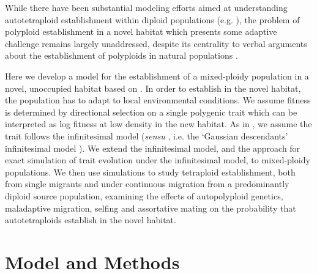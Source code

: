 \documentclass[unnumsec,webpdf,modern,large]{_oup-authoring-template}
\theoremstyle{thmstyleone}%
\theoremstyle{thmstyletwo}%
\theoremstyle{thmstylethree}%
\begin{document}
While there have been substantial modeling efforts aimed at understanding
autotetraploid establishment within diploid populations (e.g. \cite{levin1975,
felber1991, felber1997, rausch2005, oswald2011, clo2022c, griswold2021}), the
problem of polyploid establishment in a novel habitat which presents some adaptive
challenge remains largely unaddressed, despite its centrality to verbal
arguments about the establishment of polyploids in natural populations
\citep{kolar2017, vandepeer2021, clo2022d}.

Here we develop a model for the establishment of a mixed-ploidy population in a
novel, unoccupied habitat based on \cite{barton2018}.
In order to establish in the novel habitat, the population has to adapt to
local environmental conditions.
We assume fitness is determined by directional selection on a single polygenic
trait which can be interpreted as log fitness at low density in the new
habitat.
As in \cite{barton2018}, we assume the trait follows the infinitesimal
model (\textit{sensu} \cite{barton2017}, i.e. the `Gaussian descendants'
infinitesimal model \citep{turelli2017}).
We extend the infinitesimal model, and the approach for exact simulation of
trait evolution under the infinitesimal model, to mixed-ploidy populations.
We then use simulations to study tetraploid establishment, both from single
migrants and under continuous migration from a predominantly diploid source
population, examining the effects of autopolyploid genetics,
maladaptive migration, selfing and assortative mating on the probability that
autotetraploids establish in the novel habitat.


\section*{Model and Methods}
\end{document}
